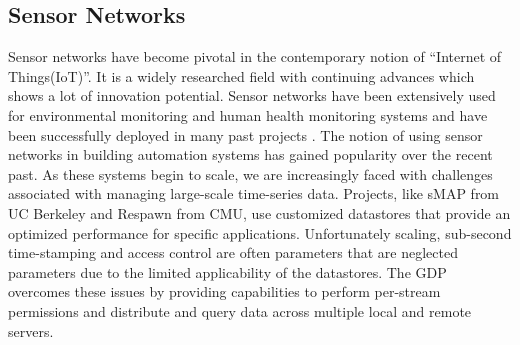 \subsection{Sensor Networks}
Sensor networks have become pivotal in the contemporary notion of “Internet of Things(IoT)”. It is a widely researched field with continuing advances which shows a lot of innovation potential. Sensor networks have been extensively used for environmental monitoring and human health monitoring systems and have been successfully deployed in many past projects \cite{ducks}. The notion of using sensor networks in building automation systems has gained popularity over the recent past. As these systems begin to scale, we are increasingly faced with challenges associated with managing large-scale time-series data. Projects, like sMAP from UC Berkeley \cite{smap} and Respawn \cite{respawn} from CMU, use customized datastores that provide an optimized performance for specific applications. Unfortunately scaling, sub-second time-stamping and access control are often parameters that are neglected parameters due to the limited applicability of the datastores. The GDP overcomes these issues by providing capabilities to perform per-stream permissions and distribute and query data across multiple local and remote servers.